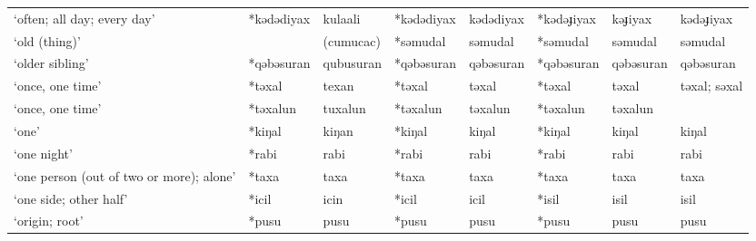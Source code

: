 \begin{landscape}
\begin{longtable}[c]{@{}p{3cm}<{\raggedright}p{2.75cm}<{\raggedright}p{2.75cm}<{\raggedright}p{2.75cm}<{\raggedright}p{2.75cm}<{\raggedright}p{2.75cm}<{\raggedright}p{2.75cm}<{\raggedright}p{2.75cm}<{\raggedright}@{}}
`often; all day; every day'                          & *kədədiyax         & kulaali                        & *kədədiyax         & kədədiyax                  & *kədəɟiyax       & kəɟiyax                  & kədəɟiyax                         \\
`old (thing)'                                        &            & (cumucac)                        & *səmudal           & səmudal                    & *səmudal         & səmudal                  & səmudal                           \\
`older sibling'                                      & *qəbəsuran         & qubusuran                      & *qəbəsuran         & qəbəsuran                  & *qəbəsuran       & qəbəsuran                & qəbəsuran                         \\
`once, one time'                                     & *təxal             & texan                          & *təxal             & təxal                      & *təxal           & təxal                    & təxal; səxal                      \\
`once, one time'                                     & *təxalun           & tuxalun                        & *təxalun           & təxalun                    & *təxalun         & təxalun                  &                                   \\
`one'                                                & *kiŋal             & kiŋan                          & *kiŋal             & kiŋal                      & *kiŋal           & kiŋal                    & kiŋal                             \\
`one night'                                          & *rabi              & rabi                           & *rabi              & rabi                       & *rabi            & rabi                     & rabi                              \\
`one person (out of two or more); alone'             & *taxa              & taxa                           & *taxa              & taxa                       & *taxa            & taxa                     & taxa                              \\
`one side; other half'                               & *icil              & icin                           & *icil              & icil                       & *isil            & isil                     & isil                              \\
`origin; root'                                       & *pusu              & pusu                           & *pusu              & pusu                       & *pusu            & pusu                     & pusu                              \\

\end{longtable}
\end{landscape}
